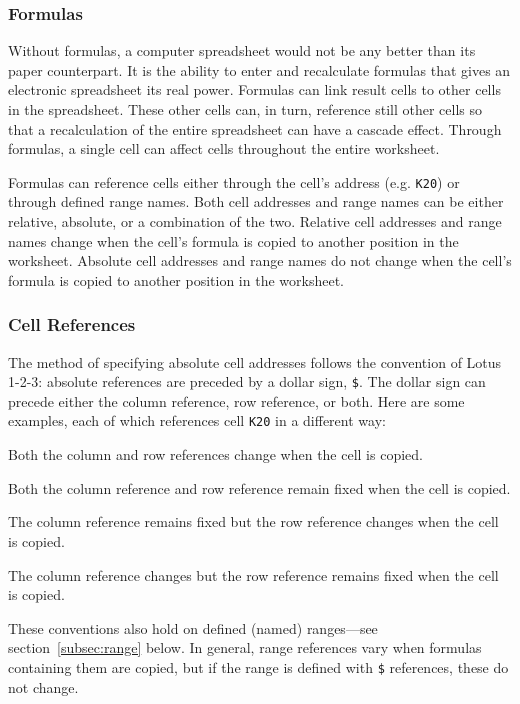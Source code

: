 \documentclass[titlepage]{article}
\newcommand{\titem}[1]{\item[{\tt #1}]}
\newcommand{\namelistlabel}[1]{\mbox{#1}\hfil}
\newenvironment{namelist}[1]{%
\begin{list}{}
  {
   \let\makelabel\namelistlabel
   \settowidth{\labelwidth}{#1}
   \setlength{\leftmargin}{1.1\labelwidth}
  }
}{%
\end{list}}
\begin{document}
\subsubsection{Formulas}

Without formulas, a computer spreadsheet would not be any better
than its paper counterpart.  It is the ability to enter and
recalculate formulas that gives an electronic spreadsheet its real
power.  Formulas can link result cells to other cells in the
spreadsheet.  These other cells can, in turn, reference still other
cells so that a recalculation of the entire spreadsheet can have a
cascade effect.  Through formulas, a single cell can affect cells
throughout the entire worksheet.

Formulas can reference cells either through the cell's address (e.g.
\texttt{K20}) or through defined range names.  Both cell addresses and
range names can be either relative, absolute, or a combination of the
two.  Relative cell addresses and range names change when the cell's
formula is copied to another position in the worksheet.  Absolute cell
addresses and range names do not change when the cell's formula is
copied to another position in the worksheet.

\subsubsection{Cell References}

The method of specifying absolute cell addresses follows the
convention of \textsf{Lotus 1-2-3}: absolute references are preceded
by a dollar sign, \texttt{\$}.  The dollar sign can precede either the
column reference, row reference, or both.  Here are some examples,
each of which references cell \texttt{K20} in a different way:

\begin{namelist}{\$K\$20xx}
\titem{K20} Both the column and row
    references change when the cell is copied.
  
\titem{\$K\$20} Both the column reference
    and row reference remain fixed when the cell is copied.
  
\titem{\$K20} The column reference remains
    fixed but the row reference changes when the cell is copied.
  
\titem{K\$20} The column reference changes
    but the row reference remains fixed when the cell is copied.
\end{namelist}

These conventions also hold on defined (named) ranges---see
section~\ref{subsec:range} below.  In general, range references vary
when formulas containing them are copied, but if the range is defined
with \texttt{\$} references, these do not change.
\end{document}
